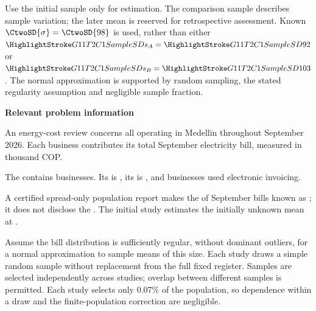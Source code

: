Use the initial sample only for estimation. The comparison sample describes sample variation; the later mean is reserved for retrospective assessment. Known $\CtwoSD{\sigma}=\CtwoSD{98}$ is used, rather than either $\SSD{s_A}=\SSD{92}$ or $\SSD{s_B}=\SSD{103}$. The normal approximation is supported by random sampling, the stated regularity assumption and negligible sample fraction.

\secInicio[][sec:p1]

\clearpage



\textbf{Relevant problem information}

\begin{probleminfoexcerpt}
An energy-cost review concerns all     operating in Medellin throughout September 2026. Each business contributes its total September electricity bill, measured in thousand COP.
\end{probleminfoexcerpt}

\begin{probleminfoexcerpt}
The     contains  businesses. Its   is   , its    is   , and  businesses used electronic invoicing.
\end{probleminfoexcerpt}

\begin{probleminfoexcerpt}
A certified spread-only population report makes the    of September bills known as   ; it does not disclose the  . The initial study estimates the initially unknown mean at  .
\end{probleminfoexcerpt}

\begin{probleminfoexcerpt}
Assume the bill distribution is sufficiently regular, without dominant outliers, for a normal approximation to sample means of this size. Each study draws a simple random sample without replacement from the full fixed register. Samples are selected independently across studies; overlap between different samples is permitted. Each study selects only 0.07\% of the population, so dependence within a draw and the finite-population correction are negligible.
\end{probleminfoexcerpt}

